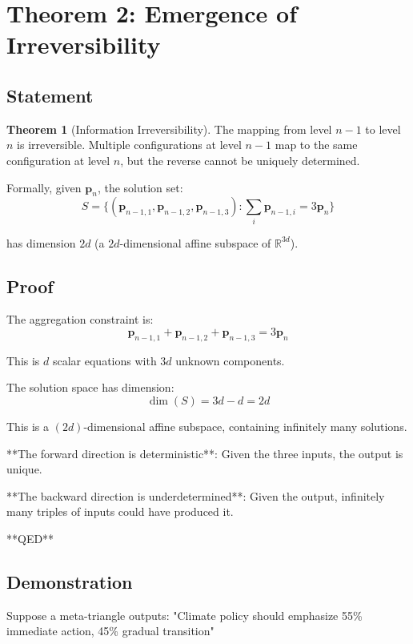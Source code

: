\documentclass[12pt,a4paper]{article}
\theoremstyle{definition}
\newtheorem{theorem}{Theorem}[section]
\begin{document}
\section{Theorem 2: Emergence of Irreversibility}

\subsection{Statement}

\begin{theorem}[Information Irreversibility]
The mapping from level $n-1$ to level $n$ is irreversible. Multiple configurations at level $n-1$ map to the same configuration at level $n$, but the reverse cannot be uniquely determined.

Formally, given $\mathbf{p}_n$, the solution set:
$$S = \{(\mathbf{p}_{n-1,1}, \mathbf{p}_{n-1,2}, \mathbf{p}_{n-1,3}) : \sum_i \mathbf{p}_{n-1,i} = 3\mathbf{p}_n\}$$

has dimension $2d$ (a $2d$-dimensional affine subspace of $\mathbb{R}^{3d}$).
\end{theorem}

\subsection{Proof}

The aggregation constraint is:
$$\mathbf{p}_{n-1,1} + \mathbf{p}_{n-1,2} + \mathbf{p}_{n-1,3} = 3\mathbf{p}_n$$

This is $d$ scalar equations with $3d$ unknown components.

The solution space has dimension:
$$\dim(S) = 3d - d = 2d$$

This is a $(2d)$-dimensional affine subspace, containing infinitely many solutions.

**The forward direction is deterministic**: Given the three inputs, the output is unique.

**The backward direction is underdetermined**: Given the output, infinitely many triples of inputs could have produced it.

**QED**

\subsection{Demonstration}

Suppose a meta-triangle outputs: "Climate policy should emphasize 55\% immediate action, 45\% gradual transition"
\end{document}
